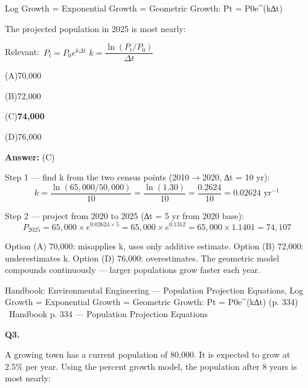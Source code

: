 \documentclass[11pt]{article}
\newcommand{\correct}[1]{\textbf{#1}\;{\color{accent}$\checkmark$}}
\newcommand{\optline}[2]{\par\noindent\hspace{1.2em}(#1)\hspace{0.6em}#2}
\begin{document}
Log Growth = Exponential Growth = Geometric Growth: Pt = P0e\textasciicircum{}(k∆t)

The projected population in 2025 is most nearly:\par\vspace{3pt}
{\small\color{soft}Relevant:}\ $P_t = P_0 e^{k\Delta t}$ \quad $k = \dfrac{\ln(P_t / P_0)}{\Delta t}$\par\vspace{3pt}
\optline{A}{70,000}
\optline{B}{72,000}
\optline{C}{\correct{74,000}}
\optline{D}{76,000}
\par\vspace{3pt}
\vspace{2pt}\par\noindent\colorbox{boxbg}{\parbox{\dimexpr\linewidth-2\fboxsep\relax}{%
\vspace{2pt}\textbf{Answer:} (C)\par\vspace{2pt}
{\small Step 1 --- find k from the two census points (2010$\rightarrow$2020, ∆t = 10 yr):
\[k = \frac{\ln(65{,}000/50{,}000)}{10} = \frac{\ln(1.30)}{10} = \frac{0.2624}{10} = 0.02624\text{ yr}^{-1}\]

Step 2 --- project from 2020 to 2025 (∆t = 5 yr from 2020 base):
\[P_{2025} = 65{,}000 \times e^{0.02624\times5} = 65{,}000 \times e^{0.1312} = 65{,}000 \times 1.1401 = 74{,}107\]

Option (A) 70,000: misapplies k, uses only additive estimate. Option (B) 72,000: underestimates k. Option (D) 76,000: overestimates. The geometric model compounds continuously --- larger populations grow faster each year.}\par\vspace{2pt}
{\footnotesize\color{soft}Handbook: Environmental Engineering --- Population Projection Equations, Log Growth = Exponential Growth = Geometric Growth: Pt = P0e\textasciicircum{}(k∆t) (p. 334) \textbullet\ Handbook p. 334 --- Population Projection Equations}\vspace{2pt}
}}
\vspace{9pt}
\filbreak
\textbf{\color{accent}Q3.}\par\vspace{2pt}
A growing town has a current population of 80,000. It is expected to grow at 2.5\% per year. Using the percent growth model, the population after 8 years is most nearly:
\end{document}
